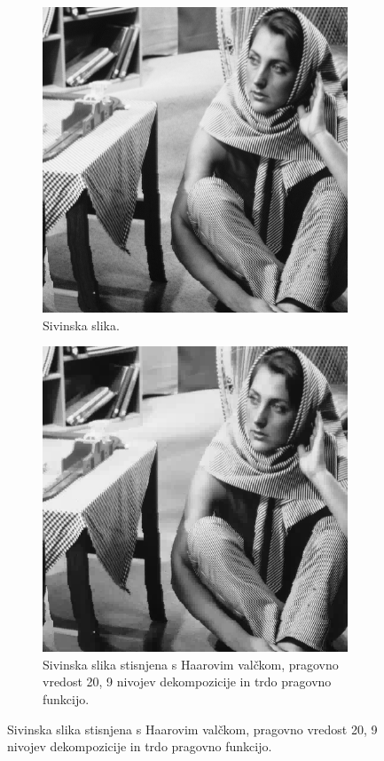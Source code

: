 \documentclass[a4paper,11pt]{article}
\begin{document}
\begin{figure}
\begin{subfigure}[t]{0.48\textwidth}
\includegraphics[width=1\textwidth]{images/barbara_gray.png}
\caption{Sivinska slika.} \label{slika3}
\end{subfigure}
\hspace*{\fill} %
\begin{subfigure}[t]{0.48\textwidth}
\includegraphics[width=1\textwidth]{images/report/barbara_gray_comp.png}
\caption{Sivinska slika stisnjena s Haarovim valčkom, pragovno vredost 20, 9 nivojev dekompozicije in trdo pragovno funkcijo.} \label{slika3:comp}
\end{subfigure}
\end{figure}
\end{document}
